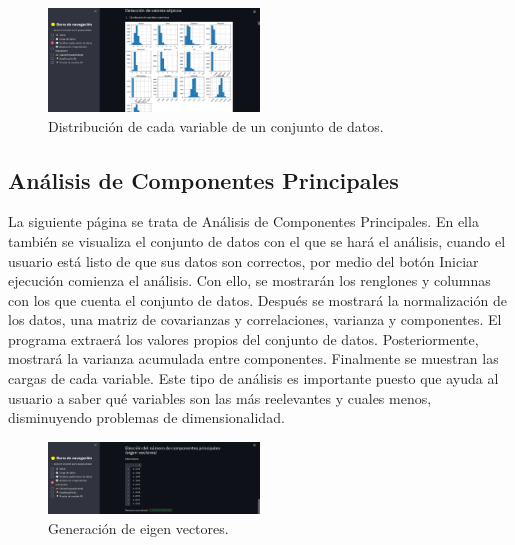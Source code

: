 \documentclass{article}
\begin{document}
\begin{figure}[!htb]
	\centering
	\includegraphics[width=0.5\textwidth]{figures/pagina-eda.png}
	\caption{Distribución de cada variable de un conjunto de datos.}
	\label{fig:pagina-eda}
\end{figure}

\subsection{Análisis de Componentes Principales}
\noindent La siguiente página se trata de Análisis de Componentes Principales. En ella también se visualiza el conjunto de datos con el que se hará el análisis, cuando el usuario está
listo de que sus datos son correctos, por medio del botón Iniciar ejecución comienza el análisis. Con ello, se mostrarán los renglones y columnas con los que cuenta el conjunto de datos.
Después se mostrará la normalización de los datos, una matriz de covarianzas y correlaciones, varianza y componentes. El programa extraerá los valores propios del conjunto de datos.
Posteriormente, mostrará la varianza acumulada entre componentes. Finalmente se muestran las cargas de cada variable. Este tipo de análisis es importante puesto que ayuda al usuario a
saber qué variables son las más reelevantes y cuales menos, disminuyendo problemas de dimensionalidad.

\begin{figure}[!htb]
	\centering
	\includegraphics[width=0.5\textwidth]{figures/pagina-pca.png}
	\caption{Generación de eigen vectores.}
	\label{fig:pagina-pca}
\end{figure}
\end{document}
